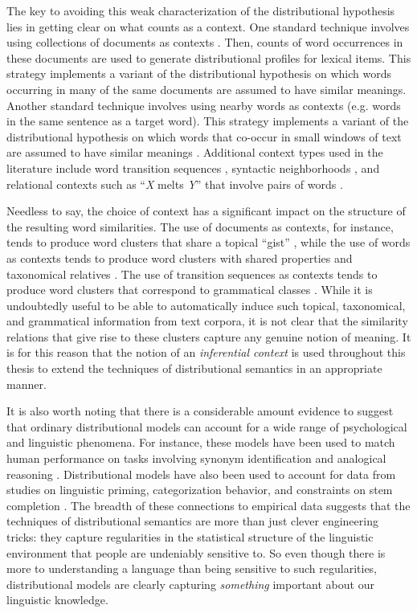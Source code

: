 The key to avoiding this weak characterization of the distributional hypothesis lies in getting clear on what counts as a context. One standard technique involves using collections of documents as contexts \citep[e.g.][]{LandauerDumais:1997}. Then, counts of word occurrences in these documents are used to generate distributional profiles for lexical items. This strategy implements a variant of the distributional hypothesis on which words occurring in many of the same documents are assumed to have similar meanings. Another standard technique involves using nearby words as contexts (e.g. words in the same sentence as a target word). This strategy implements a variant of the distributional hypothesis on which words that co-occur in small windows of text are assumed to have similar meanings \citep[see e.g.][]{JonesMewhort:2007,Sahlgren:2008,TurneyPantel:2010}. Additional context types used in the literature include word transition sequences \citep{JonesMewhort:2007}, syntactic neighborhoods \citep{Baroni:2014}, and relational contexts such as ``\textit{X} melts \textit{Y}'' that involve pairs of words \citep[see][p. 148-149]{TurneyPantel:2010}. 

Needless to say, the choice of context has a significant impact on the structure of the resulting word similarities. The use of documents as contexts, for instance, tends to produce word clusters that share a topical ``gist'' \citep{Baroni:2014}, while the use of words as contexts tends to produce word clusters with shared properties and taxonomical relatives \citep{TurneyPantel:2010}. The use of transition sequences as contexts tends to produce word clusters that correspond to grammatical classes \citep{JonesMewhort:2007}. While it is undoubtedly useful to be able to automatically induce such topical, taxonomical, and grammatical information from text corpora, it is not clear that the similarity relations that give rise to these clusters capture any genuine notion of meaning. It is for this reason that the notion of an \textit{inferential context} is used throughout this thesis to extend the techniques of distributional semantics in an appropriate manner.

It is also worth noting that there is a considerable amount evidence to suggest that ordinary distributional models can account for a wide range of psychological and linguistic phenomena. For instance, these models have been used to match human performance on tasks involving synonym identification \citep{LandauerDumais:1997} and analogical reasoning \citep{Plate:2003,Eliasmith:2001}. Distributional models have also been used to account for data from studies on linguistic priming, categorization behavior, and constraints on stem completion \citep{JonesMewhort:2007}. The breadth of these connections to empirical data suggests that the techniques of distributional semantics are more than just clever engineering tricks: they capture regularities in the statistical structure of the linguistic environment that people are undeniably sensitive to. So even though there is more to understanding a language than being sensitive to such regularities, distributional models are clearly capturing \textit{something} important about our linguistic knowledge.

